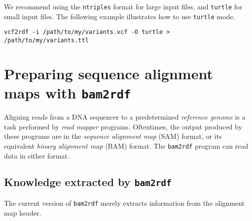   We recommend using the \texttt{ntriples} format for large input files, and
  \texttt{turtle} for small input files.  The following example illustrates how to
  use \texttt{turtle} mode.

\begin{siderules}
\begin{verbatim}
vcf2rdf -i /path/to/my/variants.vcf -O turtle > /path/to/my/variants.ttl
\end{verbatim}
\end{siderules}

\section{Preparing sequence alignment maps with \texttt{bam2rdf}}

  Aligning reads from a DNA sequencer to a predetermined \emph{reference genome}
  is a task performed by \emph{read mapper} programs.  Oftentimes, the output
  produced by these programs are in the \emph{sequence alignment map} (SAM) format,
  or its equivalent \emph{binary alignment map} (BAM) format.  The \texttt{bam2rdf}
  program can read data in either format.

\subsection{Knowledge extracted by \texttt{bam2rdf}}

  The current version of \texttt{bam2rdf} merely extracts information from the
  alignment map header.

